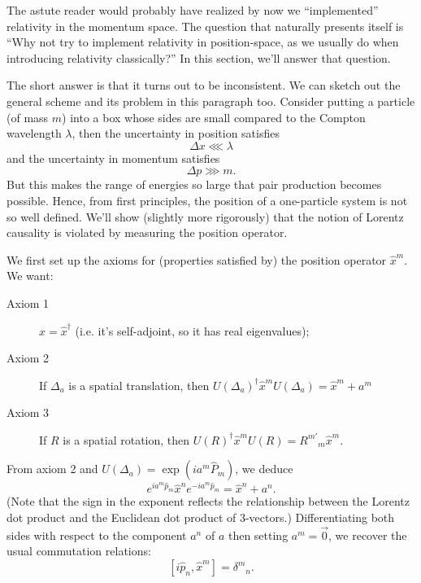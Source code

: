 
The astute reader would probably have realized by now we
``implemented'' relativity in the momentum space. The question
that naturally presents itself is ``Why not try to implement
relativity in position-space, as we usually do when introducing
relativity classically?'' In this section, we'll answer that
question. 

The short answer is that it turns out to be inconsistent. We can
sketch out the general scheme and its problem in this paragraph
too. Consider putting a particle (of mass $m$) into a box whose
sides are small compared to the Compton wavelength $\lambda$,
then the uncertainty in position satisfies
\begin{equation}%
\Delta x\lll\lambda
\end{equation}
and the uncertainty in momentum satisfies
\begin{equation}%
\Delta p\ggg m.
\end{equation}
But this makes the range of energies so large that pair
production becomes possible. Hence, from first principles, the
position of a one-particle system is not so well defined. We'll
show (slightly more rigorously) that the notion of Lorentz
causality is violated by measuring the position operator.

We first set up the axioms for (properties satisfied by) the
position operator $\widehat{x}^{m}$. We want:
\begin{description}
\item[Axiom 1] $\widehat{x}=\widehat{x}^{\dag}$ (i.e. it's
  self-adjoint, so it has real eigenvalues);
\item[Axiom 2] If $\Delta_{a}$ is a spatial translation, then
  $U(\Delta_{a})^{\dag}\widehat{x}^{m}U(\Delta_{a}) = \widehat{x}^{m}+a^{m}$
\item[Axiom 3] If $R$ is a spatial rotation, then
  $U(R)^{\dag}\widehat{x}^{m}U(R) = {R^{m'}}_{m}\widehat{x}^{m}$.
\end{description}
From axiom 2 and $U(\Delta_{a}) = \exp(ia^{m}\widehat{P}_{m})$,
we deduce
\begin{equation}%
e^{ia^{m}\widehat{p}_{m}}\widehat{x}^{n}e^{-ia^{m}\widehat{p}_{m}}=\widehat{x}^{n}+a^{n}.
\end{equation}
(Note that the sign in the exponent reflects the relationship
between the Lorentz dot product and the Euclidean dot product of
3-vectors.) Differentiating both sides with respect to the
component $a^{n}$ of $a$ then setting $a^{m}=\vec{0}$, we recover
the usual commutation relations:
\begin{equation}\label{eq:recoveryCanonicalCommutationRelations}
[i\widehat{p}_{n},\widehat{x}^{m}] = {\delta^{m}}_{n}.
\end{equation}

